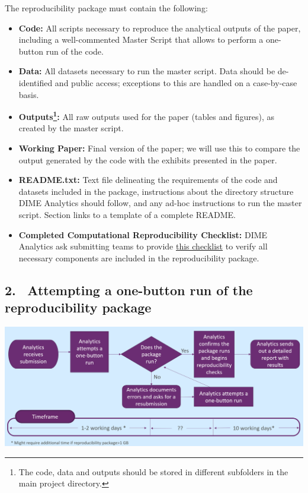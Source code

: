 \begin{fullwidth}
	The reproducibility package must contain the following:

	\bigskip

	\begin{itemize}
		\setlength\itemsep{-0.1em}
		\item \textbf{Code:} All scripts necessary to reproduce the analytical outputs of the paper, including a well-commented Master Script that allows to perform a one-button run of the code.
		\item \textbf{Data:} All datasets necessary to run the master script. Data should be de-identified and public access; exceptions to this are handled on a case-by-case basis.
		\item \textbf{Outputs\footnote{The code, data and outputs should be stored in different subfolders in the main project directory.}:} All raw outputs used for the paper (tables and figures), as created by the master script.
		\item \textbf{Working Paper:} Final version of the paper; we will use this to compare the output generated by the code with the exhibits presented in the paper.
		\item \textbf{README.txt:} Text file delineating the requirements of the code and datasets included in the package, instructions about the directory structure DIME Analytics should follow, and any ad-hoc instructions to run the master script. Section  links to a template of a complete README.
		\item \textbf{Completed Computational Reproducibility Checklist:} DIME Analytics ask submitting teams to provide \href{https://raw.githubusercontent.com/worldbank/dime-standards/master/dime-research-standards/pillar-3-research-reproducibility/checklists/Reproducibility%20package%20submission%20checklist.pdf}{this checklist} to verify all necessary components are included in the reproducibility package.
	\end{itemize}

	\subsection{2. \, Attempting a one-button run of the reproducibility package}

	\bigskip

	\begin{center}
		\includegraphics[width=0.9\linewidth]{../img/rep-checks-timeline.png}
	\end{center}


\end{fullwidth}
